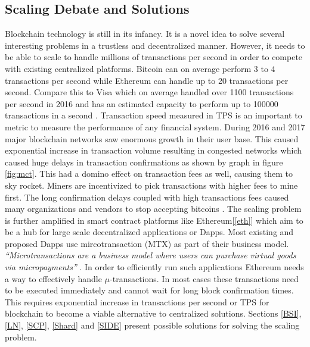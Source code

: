 \subsection{Scaling Debate and Solutions}\label{scaling} 
Blockchain technology is still in its infancy. It is a novel idea to solve several interesting problems in a trustless and decentralized manner. However, it needs to be able to scale to handle millions of transactions per second in order to compete with existing centralized platforms. Bitcoin can on average perform 3 to 4 transactions per second while Ethereum can handle up to 20 transactions per second. Compare this to Visa which on average handled over 1100 transactions per second in 2016 and has an estimated capacity to perform up to 100000 transactions in a second \cite{medium:003}. Transaction speed measured in TPS is an important to metric to measure the performance of any financial system. During 2016 and 2017 major blockchain networks saw enormous growth in their user base. This caused exponential increase in transaction volume resulting in congested networks which caused huge delays in transaction confirmations as shown by graph in figure \ref{fig:mct}. This had a domino effect on transaction fees as well, causing them to sky rocket. Miners are incentivized to pick transactions with higher fees to mine first. The long confirmation delays coupled with high transactions fees caused many organizations and vendors to stop accepting bitcoins \cite{misc:022}. The scaling problem is further amplified in smart contract platforms like Ethereum[\ref{eth}] which aim to be a hub for large scale decentralized applications or Dapps. Most existing and proposed Dapps use mircotransaction (MTX) as part of their business model. \textit{“Microtransactions are a business model where users can purchase virtual goods via micropayments”} \cite{wiki:007}. In order to efficiently run such applications Ethereum needs a way to effectively handle $\mu$-transactions. In most cases these transactions need to be executed immediately and cannot wait for long block confirmation times. This requires exponential increase in transactions per second or TPS for blockchain to become a viable alternative to centralized solutions. Sections \ref{BSI}, \ref{LN}, \ref{SCP}, \ref{Shard} and  \ref{SIDE} present possible solutions for solving the scaling problem.

